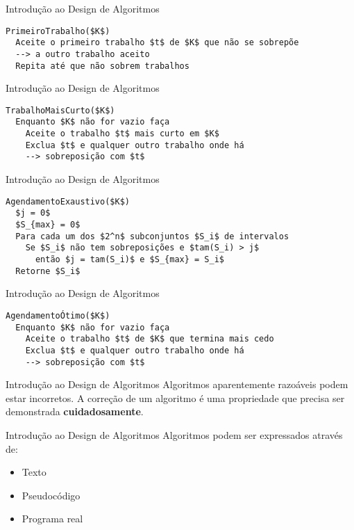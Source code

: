 \documentclass[10pt]{beamer}
\begin{document}
\begin{frame}[fragile]{Introdução ao Design de Algoritmos}
    \begin{lstlisting}
PrimeiroTrabalho($K$)
  Aceite o primeiro trabalho $t$ de $K$ que não se sobrepõe
  --> a outro trabalho aceito
  Repita até que não sobrem trabalhos
    \end{lstlisting}
\end{frame}

\begin{frame}[fragile]{Introdução ao Design de Algoritmos}
    \begin{lstlisting}
TrabalhoMaisCurto($K$)
  Enquanto $K$ não for vazio faça
    Aceite o trabalho $t$ mais curto em $K$
    Exclua $t$ e qualquer outro trabalho onde há
    --> sobreposição com $t$
    \end{lstlisting}
\end{frame}

\begin{frame}[fragile]{Introdução ao Design de Algoritmos}
    \begin{lstlisting}
AgendamentoExaustivo($K$)
  $j = 0$
  $S_{max} = 0$
  Para cada um dos $2^n$ subconjuntos $S_i$ de intervalos
    Se $S_i$ não tem sobreposições e $tam(S_i) > j$
      então $j = tam(S_i)$ e $S_{max} = S_i$
  Retorne $S_i$
    \end{lstlisting}
\end{frame}

\begin{frame}[fragile]{Introdução ao Design de Algoritmos}
    \begin{lstlisting}
AgendamentoÓtimo($K$)
  Enquanto $K$ não for vazio faça
    Aceite o trabalho $t$ de $K$ que termina mais cedo
    Exclua $t$ e qualquer outro trabalho onde há
    --> sobreposição com $t$
    \end{lstlisting}
\end{frame}

\begin{frame}{Introdução ao Design de Algoritmos}
    \huge
    Algoritmos aparentemente razoáveis podem estar incorretos. A correção de um algoritmo é uma propriedade que precisa ser demonstrada \textbf{cuidadosamente}.
\end{frame}

\begin{frame}{Introdução ao Design de Algoritmos}
    \Large
    Algoritmos podem ser expressados através de:

    \begin{itemize}
        \item \Large Texto
        \item \Large Pseudocódigo
        \item \Large Programa real
    \end{itemize}

\end{frame}
\end{document}
